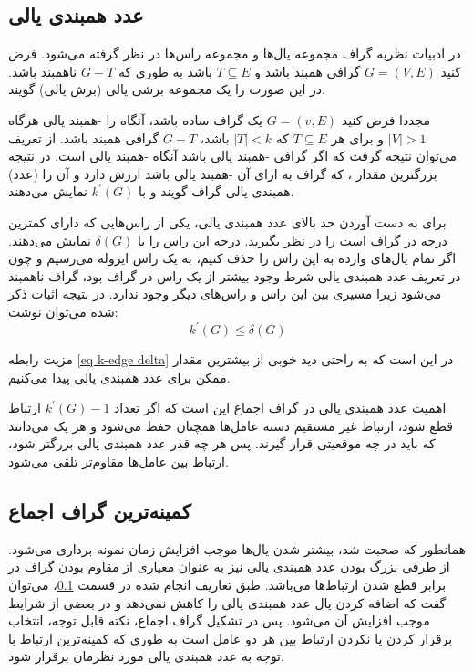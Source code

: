 \subsection{عدد همبندی یالی}\label{se edge connectivity}

 در ادبیات نظریه گراف  مجموعه یال‌ها و  مجموعه راس‌ها در نظر گرفته می‌شود. فرض کنید
$ G = (V,E)$
  گرافی همبند باشد و 
$T \subseteq E$
باشد به طوری که 
$G - T$
ناهمبند باشد. در این صورت  را یک مجموعه برشی یالی (برش یالی) گویند.

مجددا فرض کنید 
$ G = (v,E)$
یک گراف ساده باشد، آنگاه  را -همبند یالی هرگاه 
$|V| > 1$
 و برای هر 
$T \subseteq E$
 که 
$|T| < k$
 باشد، 
$G - T$
گرافی همبند باشد. از تعریف می‌توان نتیجه گرفت که اگر گرافی -همبند یالی باشد آنگاه -همبند یالی است. در نتیجه بزرگترین مقدار ، که گراف  به ازای آن -همبند یالی باشد ارزش دارد و آن را (عدد) همبندی یالی گراف  گویند و با 
$k^\prime(G)$
نمایش می‌دهند.

برای به دست آوردن حد بالای عدد همبندی یالی، یکی از راس‌هایی که دارای کمترین درجه در گراف است را در نظر بگیرید. درجه این راس را با 
$\delta(G)$
نمایش می‌دهند. اگر تمام یال‌های وارده به این راس را حذف کنیم، به یک راس ایزوله می‌رسیم و چون در تعریف عدد همبندی یالی شرط وجود بیشتر از یک راس در گراف بود، گراف ناهمبند می‌شود زیرا مسیری بین این راس و راس‌های دیگر وجود ندارد. در نتیجه اثبات ذکر شده می‌توان نوشت:
\begin{equation}\label{eq k-edge delta}
k^\prime(G) \leq \delta(G)
\end{equation}

مزیت رابطه \ref{eq k-edge delta} در این است که به راحتی دید خوبی از بیشترین مقدار ممکن برای عدد همبندی یالی پیدا می‌کنیم.

اهمیت عدد همبندی یالی در گراف اجماع این است که اگر تعداد 
$k^\prime(G) - 1$
 ارتباط قطع شود، ارتباط غیر مستقیم دسته عامل‌ها همچنان حفظ می‌شود و هر یک می‌دانند که باید در چه موقعیتی قرار گیرند. پس هر چه قدر عدد همبندی یالی بزرگتر شود، ارتباط بین عامل‌ها مقاوم‌تر تلقی می‌شود.

\subsection{کمینه‌ترین گراف اجماع}\label{sec least formation graph}

همانطور که صحبت شد، بیشتر شدن یال‌ها موجب افزایش زمان نمونه برداری می‌شود. از طرفی بزرگ بودن عدد همبندی یالی نیز به عنوان معیاری از مقاوم بودن گراف در برابر قطع شدن ارتباط‌ها می‌باشد. طبق تعاریف انجام شده در قسمت \ref{se edge connectivity}، می‌توان گفت که اضافه کردن یال عدد همبندی یالی را کاهش نمی‌دهد و در بعضی از شرایط موجب افزایش آن می‌شود. پس در تشکیل گراف اجماع، نکته قابل توجه، انتخاب برقرار کردن یا نکردن ارتباط بین هر دو عامل است به طوری که کمینه‌ترین ارتباط با توجه به عدد همبندی یالی مورد نظرمان برقرار شود.

